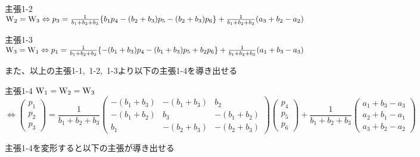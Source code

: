 \documentclass[11pt]{jarticle} %
\begin{document}
\vspace{5mm}

\begin{itembox}[l]{主張1-2}
${\rm W_{2}}={\rm W_{3}}\Leftrightarrow p_3=\frac{1}{b_1+b_2+b_3}\{b_1p_4-(b_2+b_3)p_5-(b_2+b_3)p_6\}+\frac{1}{b_1+b_2+b_3}(a_3+b_2-a_2)$
\end{itembox}
\begin{itembox}[l]{主張1-3}
${\rm W_{3}}={\rm W_{1}}\Leftrightarrow p_1=\frac{1}{b_1+b_2+b_3}\{-(b_1+b_3)p_4-(b_1+b_3)p_5+b_2p_6\}+\frac{1}{b_1+b_2+b_3}(a_1+b_3-a_3)$
\end{itembox}

また、以上の主張1-1,~1-2,~1-3より以下の主張1-4を導き出せる

\begin{itembox}[l]{主張1-4}
${\rm W_{1}}={\rm W_{2}}={\rm W_{3}} $
{\scriptsize \[\Leftrightarrow
\left(
\begin{array}{c}
p_1 \\
p_2 \\
p_3
\end{array}
\right)
=
\frac{1}{b_1+b_2+b_3}
\left(
\begin{array}{ccc}
-(b_1+b_3) & -(b_1+b_3) & b_2 \\
-(b_1+b_2) & b_3 & -(b_1+b_2) \\
b_1 & -(b_2+b_3) & -(b_2+b_3)
\end{array}
\right)
\left(
\begin{array}{c}
p_4 \\
p_5 \\
p_6
\end{array}
\right)
+
\frac{1}{b_1+b_2+b_3}
\left(
\begin{array}{c}
a_1+b_3-a_3 \\
a_2+b_1-a_1 \\
a_3+b_2-a_2
\end{array}
\right)
\]}
\end{itembox}

主張1-4を変形すると以下の主張が導き出せる
\end{document}
